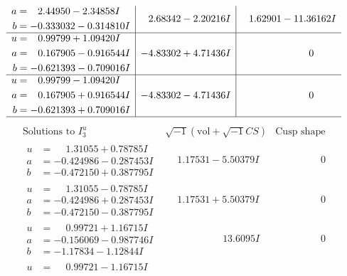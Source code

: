 \documentclass[1p]{elsarticle_modified}
\theoremstyle{definition}
\newcommand{\I}{\sqrt{-1}}
\begin{document}
$$\begin{array}{c|c|c}
\begin{aligned}
a &= \phantom{-}2.44950 - 2.34858 I \\
b &= -0.333032 - 0.314810 I\end{aligned}
 & \phantom{-}2.68342 - 2.20216 I & \phantom{-}1.62901 - 11.36162 I \\ \hline\begin{aligned}
u &= \phantom{-}0.99799 + 1.09420 I \\
a &= \phantom{-}0.167905 - 0.916544 I \\
b &= -0.621393 - 0.709016 I\end{aligned}
 & -4.83302 + 4.71436 I & \phantom{-0.000000 } 0 \\ \hline\begin{aligned}
u &= \phantom{-}0.99799 - 1.09420 I \\
a &= \phantom{-}0.167905 + 0.916544 I \\
b &= -0.621393 + 0.709016 I\end{aligned}
 & -4.83302 - 4.71436 I & \phantom{-0.000000 } 0\\
 \hline 
 \end{array}$$\newpage$$\begin{array}{c|c|c}  
\text{Solutions to }I^u_{3}& \I (\text{vol} + \sqrt{-1}CS) & \text{Cusp shape}\\
 \hline 
\begin{aligned}
u &= \phantom{-}1.31055 + 0.78785 I \\
a &= -0.424986 - 0.287453 I \\
b &= -0.472150 + 0.387795 I\end{aligned}
 & \phantom{-}1.17531 - 5.50379 I & \phantom{-0.000000 } 0 \\ \hline\begin{aligned}
u &= \phantom{-}1.31055 - 0.78785 I \\
a &= -0.424986 + 0.287453 I \\
b &= -0.472150 - 0.387795 I\end{aligned}
 & \phantom{-}1.17531 + 5.50379 I & \phantom{-0.000000 } 0 \\ \hline\begin{aligned}
u &= \phantom{-}0.99721 + 1.16715 I \\
a &= -0.156069 - 0.987746 I \\
b &= -1.17834 - 1.12844 I\end{aligned}
 & \phantom{-0.000000 -}13.6095 I & \phantom{-0.000000 } 0 \\ \hline\begin{aligned}
u &= \phantom{-}0.99721 - 1.16715 I \\

\end{aligned}
\end{array}$$
\end{document}

